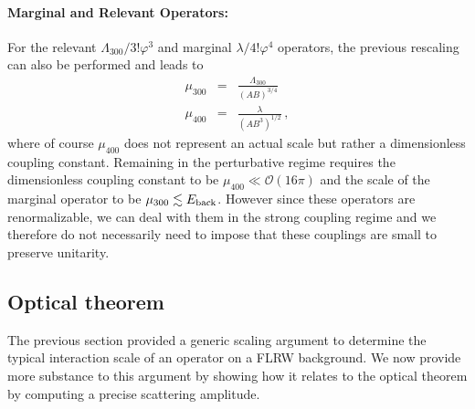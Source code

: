 \documentclass[12pt]{article}
\def\ba{\begin{eqnarray}}
\def\ea{\end{eqnarray}}
\begin{document}
\paragraph{Marginal and Relevant Operators:}

For the relevant $\Lambda_{300} / 3!  \varphi^3$ and marginal $\lambda/4! \varphi^4$ operators, the previous rescaling can also be performed and leads to
\ba
\label{eq:mu300}
\mu_{300} &=& \frac{\Lambda_{300}}{(AB)^{3/4}}\\
\mu_{400} &=& \frac{\lambda}{(AB^3)^{1/2}}\,,
\label{eq:mu400}
\ea
where of course  $\mu_{400}$ does not represent an actual scale but rather a  dimensionless coupling constant.
Remaining in the perturbative regime requires the dimensionless coupling constant to be $\mu_{400} \ll \mathcal{O}(16\pi)$ and the scale of the marginal operator to be $\mu_{300}\lesssim E_{\rm back}$.  However since these operators are renormalizable, we can deal with them in the strong coupling regime and we therefore do not necessarily need to impose that these couplings are small to preserve unitarity.

\subsection{Optical theorem}
\label{sec:Optical1}

The previous section provided a generic scaling argument to determine the typical interaction scale of an operator on a FLRW background. We now provide more substance to this argument by showing how it relates to the optical theorem by computing a  precise scattering amplitude.  \\
\end{document}

